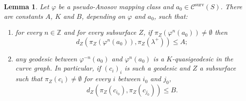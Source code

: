 \documentclass[10pt,a4paper]{amsart}
\newtheorem{lemma}{Lemma}
\newcommand{\C}{\mathcal{C}}
\newcommand{\Csurv}{\C^{\text{surv}}}
\newcommand{\Z}{\mathbb{Z}}
\newcommand{\dist}{d}
\begin{document}
\begin{lemma}\label{lem:geodesics-between-iterates}
Let \(\varphi\) be a pseudo-Anosov mapping class and \(a_0\in\Csurv(S)\). 
There are constants \(A\), \(K\) and $B$, depending on \(\varphi\) and \(a_0\), such that:
\begin{enumerate}
\item  for every \(n\in\Z\) and for every subsurface \(Z\), if $\pi_Z(\varphi^n(a_0)) \neq \emptyset$ then
\[\dist_Z(\pi_Z(\varphi^n(a_0)),\pi_Z(\lambda^+))\leq A;\]
\item  any geodesic between \(\varphi^{-n}(a_0)\) and \(\varphi^n(a_0)\) is a \(K\)-quasigeodesic in the curve graph. In particular, if \((c_i)_i\) is such a geodesic and \(Z\) a subsurface such that \(\pi_Z(c_i)\neq \emptyset\) for every \(i\) between \(i_0\) and \(j_0\),
\[\dist_Z(\pi_Z(c_{i_0}),\pi_Z(c_{j_0}))\leq B.\]
\end{enumerate}
\end{lemma}
\end{document}
